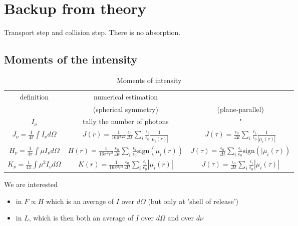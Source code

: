 \documentclass[../main/main.tex]{subfiles}
\begin{document}
\newpage
\section{Backup from theory}
Transport step and collision step. There is no absorption.

\subsection{Moments of the intensity}
\begin{table}[!htp]
\centering
{\tabulinesep=1.5mm
\begin{tabu}{|c|c|c|}
\hline 
definition 
& numerical estimation & \\
& (spherical symmetry) 
& (plane-parallel) \\  \hline \hline
$I_{\nu}$ & tally the number of photons & " \\ \hline
$J_{\nu} = \frac{1}{4 \pi} \int I_{\nu} d\Omega$ 
	& $J(r) = \frac{1}{16 \pi^2 r^2} \frac{\epsilon_0}{\Delta t} \sum_i \frac{\epsilon_i}{\epsilon_0} \frac{1}{|\mu_i(r)|}$
	& $J(\tau) = \frac{\epsilon_0}{\Delta t} \sum_i \frac{\epsilon_i}{\epsilon_0} \frac{1}{|\mu_i(\tau)|}$ \\ \hline
	
$H_{\nu} = \frac{1}{4 \pi} \int \mu I_{\nu} d\Omega$ 
	& $H(r) = \frac{1}{16 \pi^2 r^2} \frac{\epsilon_0}{\Delta t} \sum_i \frac{\epsilon_i}{\epsilon_0} \text{sign}(\mu_i(r))$ 
	& $J(\tau) = \frac{\epsilon_0}{\Delta t} \sum_i \frac{\epsilon_i}{\epsilon_0} \text{sign}(|\mu_i(\tau))$ \\ \hline
	
$K_{\nu} = \frac{1}{4 \pi} \int \mu^2 I_{\nu} d\Omega$ 
	& $K(r) = \frac{1}{16 \pi^2 r^2} \frac{\epsilon_0}{\Delta t} \sum_i \frac{\epsilon_i}{\epsilon_0} |\mu_i(r)|$ 
	& $J(\tau) = \frac{\epsilon_0}{\Delta t} \sum_i \frac{\epsilon_i}{\epsilon_0} |\mu_i(\tau)|$ \\ \hline
\end{tabu}}
\caption{Moments of intensity}
\label{compu_moments_intensity}
\end{table}

We are interested 
\begin{itemize}
\item in $F \propto H$ which is an average of $I$ over $d \Omega$ (but only at 'shell of release')
\item in $L$, which is then both an average of $I$ over $d\Omega$ and over $d\nu$
\end{itemize}
\end{document}
